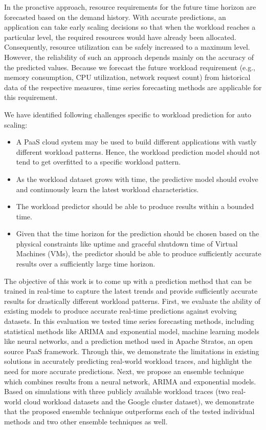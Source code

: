 In the proactive approach, resource requirements for the future time horizon are forecasted based on the demand history. With accurate predictions, an application can take early scaling decisions so that when the workload reaches a particular level, the required resources would have already been allocated. Consequently, resource utilization can be safely increased to a maximum level. However, the reliability of such an approach depends mainly on the accuracy of the predicted values. Because we forecast the future workload requirement (e.g., memory consumption, CPU utilization, network request count) from historical data of the respective measures, time series forecasting methods are applicable for this requirement.

We have identified following challenges specific to workload prediction for auto scaling:
\begin{itemize}
\item A PaaS cloud system may be used to build different applications with vastly different workload patterns. Hence, the workload prediction model should not tend to get overfitted to a specific workload pattern.
\item As the workload dataset grows with time, the predictive model should evolve and continuously learn the latest workload characteristics.
\item The workload predictor should be able to produce results within a bounded time.
\item Given that the time horizon for the prediction should be chosen based on the physical constraints like uptime and graceful shutdown time of Virtual Machines (VMs), the predictor should be able to produce sufficiently accurate results over a sufficiently large time horizon.
\end{itemize}

The objective of this work is to come up with a prediction method that can be trained in real-time to capture the latest trends and provide sufficiently accurate results for drastically different workload patterns. First, we evaluate the ability of existing models to produce accurate real-time predictions against evolving datasets. In this evaluation we tested time series forecasting methods, including statistical methods like ARIMA and exponential model, machine learning models like neural networks, and a prediction method used in Apache Stratos, an open source PaaS framework. Through this, we demonstrate the limitations in existing solutions in accurately predicting real-world workload traces, and highlight the need for more accurate predictions. Next, we propose an ensemble technique which combines results from a neural network, ARIMA and exponential models. Based on simulations with three publicly available workload traces (two real-world cloud workload datasets and the Google cluster dataset), we demonstrate that the proposed ensemble technique outperforms each of the tested individual methods and two other ensemble techniques as well.

